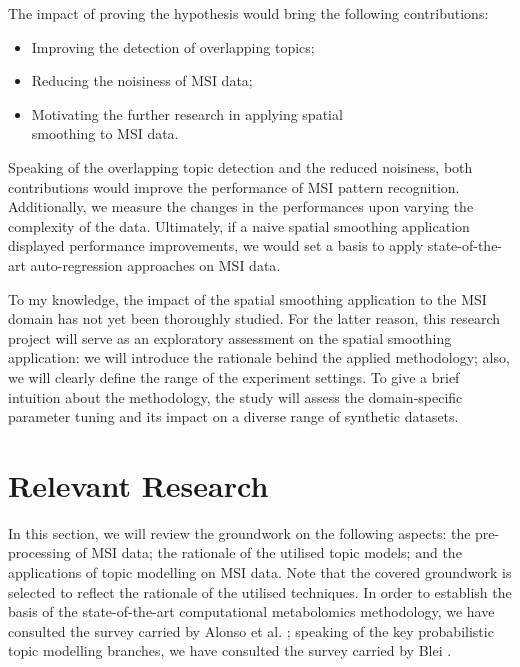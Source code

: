 \documentclass{mpaper}
\begin{document}
\par The impact of proving the hypothesis would bring the following contributions:
\begin{itemize}
	\item Improving the detection of overlapping topics;
	\item Reducing the noisiness of MSI data;
	\item Motivating the further research in applying spatial \\smoothing to MSI data.
\end{itemize} 
Speaking of the overlapping topic detection and the reduced noisiness, both contributions would improve the performance of MSI pattern recognition. Additionally, we measure the changes in the performances upon varying the complexity of the data. Ultimately, if a naive spatial smoothing application displayed performance improvements, we would set a basis to apply state-of-the-art auto-regression approaches on MSI data.

\par To my knowledge, the impact of the spatial smoothing application to the MSI domain has not yet been thoroughly studied. For the latter reason, this research project will serve as an exploratory assessment on the spatial smoothing application: we will introduce the rationale behind the applied methodology; also, we will clearly define the range of the experiment settings. To give a brief intuition about the methodology, the study will assess the domain-specific parameter tuning and its impact on a diverse range of synthetic datasets.

\section{Relevant Research}

\par In this section, we will review the groundwork on the following aspects: the pre-processing of MSI data; the rationale of the utilised topic models; and the applications of topic modelling on MSI data. Note that the covered groundwork is selected to reflect the rationale of the utilised techniques. In order to establish the basis of the state-of-the-art computational metabolomics methodology, we have consulted the survey carried by Alonso et al. \cite{alonso2015analytical}; speaking of the key probabilistic topic modelling branches, we have consulted the survey carried by Blei \cite{blei2012probabilistic}. 
\end{document}
